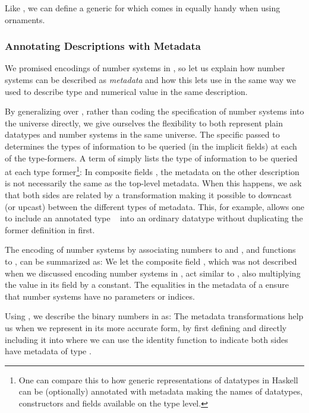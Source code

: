 Like , we can define a generic  for 
which comes in equally handy when using ornaments.

\subsubsection{Annotating Descriptions with Metadata}
We promised encodings of number systems in , so let us explain how number systems can be described as \emph{metadata} and how this lets use  in the same way we used  to describe type and numerical value in the same description.

By generalizing  over , rather than coding the specification of number systems into the universe directly, we give ourselves the flexibility to both represent plain datatypes and number systems in the same universe. The specific  passed to  determines the types of information to be queried (in the implicit  fields) at each of the type-formers. A term of  simply lists the type of information to be queried at each type former\footnote{One can compare this to how generic representations of datatypes in Haskell can be (optionally) annotated with metadata making the names of datatypes, constructors and fields available on the type level.}:
In composite fields , the metadata on the other description is not necessarily the same as the top-level metadata. When this happens, we ask that both sides are related by a transformation
making it possible to downcast (or upcast) between the different types of metadata. This, for example, allows one to include an annotated type \  into an ordinary datatype  without duplicating the former definition in  first.

The encoding of number systems by associating numbers to  and , and functions to , can be summarized as:
We let the composite field , which was not described when we discussed encoding number systems in , act similar to , also multiplying the value in its field by a constant. The equalities in the metadata of a  ensure that number systems have no parameters or indices. 

Using , we describe the binary numbers  in  as:
The metadata transformations help us when we represent  in its more accurate form, by first defining 
and directly including it into 
where we can use the identity function to indicate both sides have metadata of type .

